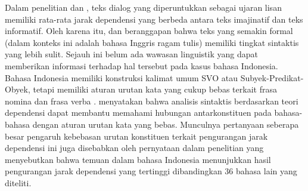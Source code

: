 Dalam penelitian \cite{hiranuma1999syntactic} dan \cite{liu2009chinese}, teks dialog yang diperuntukkan sebagai ujaran lisan memiliki rata-rata jarak dependensi yang berbeda antara teks imajinatif dan teks informatif. Oleh karena itu, \cite{hiranuma1999syntactic} dan \cite{liu2009chinese} beranggapan bahwa teks yang semakin formal (dalam konteks ini adalah bahasa Inggris ragam tulis) memiliki tingkat sintaktis yang lebih sulit. Sejauh ini belum ada wawasan linguistik yang dapat memberikan informasi terhadap hal tersebut pada kasus bahasa Indonesia. Bahasa Indonesia memiliki konstruksi kalimat umum  SVO atau Subyek-Predikat-Obyek, tetapi memiliki aturan urutan kata yang cukup bebas terkait frasa nomina dan frasa verba \citep{irmawati2015dependency}. \cite{kubler2009dependency} menyatakan bahwa analisis sintaktis berdasarkan teori dependensi dapat membantu memahami hubungan antarkonstituen pada bahasa-bahasa dengan aturan urutan kata yang bebas. Munculnya pertanyaan seberapa besar pengaruh kebebasan urutan konstituen terkait pengurangan jarak dependensi ini juga disebabkan oleh pernyataan dalam penelitian \cite{futrell2015large} yang menyebutkan bahwa temuan dalam bahasa Indonesia menunjukkan hasil pengurangan jarak dependensi yang tertinggi dibandingkan 36 bahasa lain yang diteliti.


